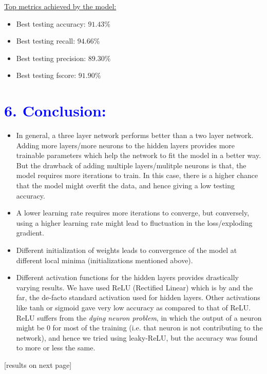 \documentclass[a4paper,10pt,twocolumn]{article}
\begin{document}
\newline
\underline{Top metrics achieved by the model:}
\begin{itemize}
\item{Best testing accuracy: $91.43\%$}
\item{Best testing recall: $94.66\%$}
\item{Best testing precision: $89.30\%$}
\item{Best testing fscore: $91.90\%$}
\end{itemize}

\section*{\textcolor{blue}{6. Conclusion:}}
\begin{itemize}
\item{In general, a three layer network performs better than a two layer network. Adding more layers/more neurons to the hidden layers provides more trainable parameters which help the network to fit the model in a better way. But the drawback of adding multiple layers/mulitple neurons is that, the model requires more iterations to train. In this case, there is a higher chance that the model might overfit the data, and hence giving a low testing accuracy.}
\item{A lower learning rate requires more iterations to converge, but conversely, using a higher learning rate might lead to fluctuation in the loss/exploding gradient.}
\item{Different initialization of weights leads to convergence of the model at different local minima (initializations mentioned above).}
\item{Different activation functions for the hidden layers provides drastically varying results. We	 have used ReLU (Rectified Linear) which is by and the far, the de-facto standard activation used for hidden layers. Other activations like tanh or sigmoid gave very low accuracy as compared to that of ReLU. ReLU suffers from the \emph{dying neuron problem}, in which the output of a neuron might be 0 for most of the training (i.e. that neuron is not contributing to the network), and hence we tried using leaky-ReLU, but the accuracy was found to more or less the same.}
\end{itemize}
[results on next page]

\newpage
\onecolumn
\end{document}
